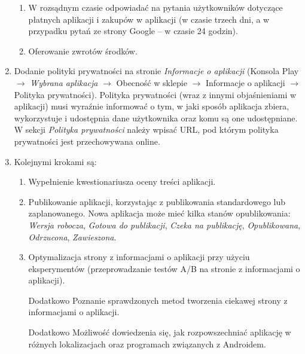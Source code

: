 \documentclass[12pt, a4paper]{article}
\begin{document}
\begin{enumerate}
\begin{enumerate}
\item W rozsądnym czasie odpowiadać na pytania użytkowników dotyczące płatnych aplikacji i zakupów w aplikacji (w czasie trzech dni, a w przypadku pytań ze strony Google -- w czasie 24 godzin).
\item Oferowanie zwrotów środków.
\end{enumerate}
\item Dodanie polityki prywatności na stronie \textit{Informacje o aplikacji} (Konsola Play $\rightarrow$ \textit{Wybrana aplikacja} $\rightarrow$ Obecność w sklepie $\rightarrow$ Informacje o aplikacji $\rightarrow$ Polityka prywatności). Polityka prywatności (wraz z innymi objaśnieniami w aplikacji) musi wyraźnie informować o tym, w jaki sposób aplikacja zbiera, wykorzystuje i udostępnia dane użytkownika oraz komu są one udostępniane. W sekcji \textit{Polityka prywatności} należy wpisać URL, pod którym polityka prywatności jest przechowywana online.
\item Kolejnymi krokami są$\colon$
\begin{enumerate}
\item Wypełnienie kwestionariusza oceny treści aplikacji.
\item Publikowanie aplikacji, korzystając z publikowania standardowego lub zaplanowanego. Nowa aplikacja może mieć kilka stanów opublikowania$\colon$ \textsl{Wersja robocza}, \textsl{Gotowa do publikacji}, \textsl{Czeka na publikację}, \textsl{Opublikowana}, \textsl{Odrzucona}, \textsl{Zawieszona}.
\item Optymalizacja strony z informacjami o aplikacji przy użyciu eksperymentów (przeprowadzanie testów A/B na stronie z informacjami o aplikacji).
\item [Dodatkowo] Poznanie sprawdzonych metod tworzenia ciekawej strony z informacjami o aplikacji.
\item [Dodatkowo] Możliwość dowiedzenia się, jak rozpowszechniać aplikację w różnych lokalizacjach oraz programach związanych z Androidem.
\end{enumerate}
\end{enumerate}
\end{document}
